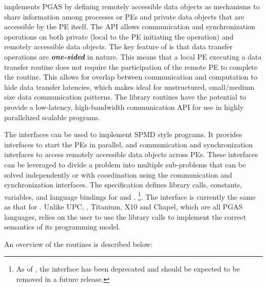 \openshmem implements \ac{PGAS} by defining remotely accessible data objects 
 as mechanisms to 
share information among \openshmem processes or \acp{PE}  
and private data objects  that are accessible by the \ac{PE} itself. 
The \ac{API} allows communication and synchronization operations on both private (local to
the PE initiating the operation) and remotely accessible data objects. The key
feature of \openshmem is that data transfer operations are
\textit{\textbf{one-sided}} in nature. This means that a local \ac{PE} executing
a data transfer routine does not require the participation of the remote \ac{PE}
to complete the routine. This allows for overlap between communication and
computation to hide data transfer latencies, which makes  \openshmem ideal for
unstructured, small/medium size data communication patterns. The \openshmem
library routines have the potential to provide a low-latency, high-bandwidth
communication \ac{API} for use in highly parallelized scalable programs.  

The \openshmem interfaces can be used to implement \ac{SPMD} style programs.
It provides interfaces to start the \openshmem \acp{PE} in parallel, and
communication and synchronization interfaces to access remotely accessible data
objects across \acp{PE}. These interfaces can be leveraged to divide a problem
into multiple sub-problems that can be solved independently or with coordination
using the communication and synchronization interfaces.  The \openshmem
specification defines library calls, constants, variables, and language bindings
for \Cstd and \Fortran.%
\footnote{As of \openshmem[1.4], the \Fortran interface has been deprecated
  and should be expected to be removed in a future release.}.
The \Cpp interface is currently the same as that
for \Cstd. Unlike UPC, \Fortran[2008], Titanium, X10 and Chapel, which are all
PGAS languages, \openshmem relies on the user to use the library calls  to
implement the correct semantics of its programming model.

An overview of the \openshmem routines is described below:

